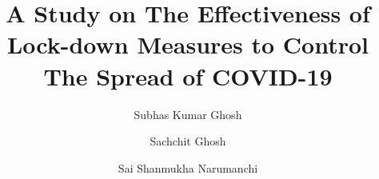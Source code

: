 \documentclass[final,authoryear,5p,times,twocolumn]{elsarticle}
\begin{document}
	
	\begin{frontmatter}
		
		
		
		\title{A Study on The Effectiveness of Lock-down Measures to Control The Spread of COVID-19}
		
		
		\author[a1]{Subhas Kumar Ghosh}
		\author[a2]{Sachchit Ghosh}
		\author[a3]{Sai Shanmukha Narumanchi}
	
		
		\address[a1]{Commonwealth Bank of Australia, Sydney, New South Wales, 2000, Australia}
		\address[a2]{The University of Sydney, Camperdown, NSW 2006, Australia}
		\address[a3]{Department of Computer Science, Southern Illinois University, Carbondale, IL 62901, USA.}
	

\end{frontmatter}
\end{document}

